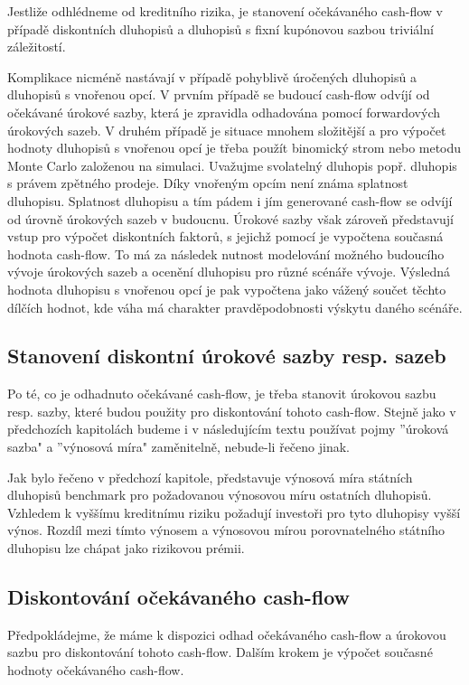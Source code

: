 \documentclass[a4paper]{book}
\begin{document}
Jestliže odhlédneme od kreditního rizika, je stanovení očekávaného cash-flow v případě diskontních dluhopisů a dluhopisů s fixní kupónovou sazbou triviální záležitostí.

Komplikace nicméně nastávají v případě pohyblivě úročených dluhopisů a dluhopisů s vnořenou opcí. V prvním případě se budoucí cash-flow odvíjí od očekávané úrokové sazby, která je zpravidla odhadována pomocí forwardových úrokových sazeb. V druhém případě je situace mnohem složitější a pro výpočet hodnoty dluhopisů s vnořenou opcí je třeba použít binomický strom nebo metodu Monte Carlo založenou na simulaci. Uvažujme svolatelný dluhopis popř. dluhopis s právem zpětného prodeje. Díky vnořeným opcím není známa splatnost dluhopisu. Splatnost dluhopisu a tím pádem i jím generované cash-flow se odvíjí od úrovně úrokových sazeb v budoucnu. Úrokové sazby však zároveň představují vstup pro výpočet diskontních faktorů, s jejichž pomocí je vypočtena současná hodnota cash-flow. To má za následek nutnost modelování možného budoucího vývoje úrokových sazeb a ocenění dluhopisu pro různé scénáře vývoje. Výsledná hodnota dluhopisu s vnořenou opcí je pak vypočtena jako vážený součet těchto dílčích hodnot, kde váha má charakter pravděpodobnosti výskytu daného scénáře.

\subsection{Stanovení diskontní úrokové sazby resp. sazeb}

Po té, co je odhadnuto očekávané cash-flow, je třeba stanovit úrokovou sazbu resp. sazby, které budou použity pro diskontování tohoto cash-flow. Stejně jako v předchozích kapitolách budeme i v následujícím textu používat pojmy ''úroková sazba" a ''výnosová míra" zaměnitelně, nebude-li řečeno jinak.

Jak bylo řečeno v předchozí kapitole, představuje výnosová míra státních dluhopisů benchmark pro požadovanou výnosovou míru ostatních dluhopisů. Vzhledem k vyššímu kreditnímu riziku požadují investoři pro tyto dluhopisy vyšší výnos. Rozdíl mezi tímto výnosem a výnosovou mírou porovnatelného státního dluhopisu lze chápat jako rizikovou prémii.

\subsection{Diskontování očekávaného cash-flow}

Předpokládejme, že máme k dispozici odhad očekávaného cash-flow a úrokovou sazbu pro diskontování tohoto cash-flow. Dalším krokem je výpočet současné hodnoty očekávaného cash-flow.
\end{document}
